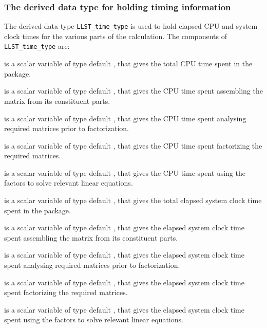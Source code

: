 \documentclass{galahad}
\newcommand{\packagename}{LLST}
\begin{document}

\subsubsection{The derived data type for holding timing 
 information}\label{typetime}
The derived data type 
{\tt \packagename\_time\_type} 
is used to hold elapsed CPU and system clock times for the various parts of 
the calculation. The components of 
{\tt \packagename\_time\_type} 
are:
\begin{description}
 is a scalar variable of type default \realdp, that gives
 the total CPU time spent in the package.

 is a scalar variable of type default \realdp, that gives
 the CPU time spent assembling the matrix  from its constituent parts.

 is a scalar variable of type default \realdp, that gives
 the CPU time spent analysing required matrices prior to factorization.

 is a scalar variable of type default \realdp, that gives
 the CPU time spent factorizing the required matrices.

 is a scalar variable of type default \realdp, that gives
 the CPU time spent using the factors to solve relevant linear equations.

 is a scalar variable of type default \realdp, that gives
 the total elapsed system clock time spent in the package.

 is a scalar variable of type default \realdp, that gives
 the elapsed system clock time spent assembling the matrix  from 
its constituent parts.

 is a scalar variable of type default \realdp, that gives
 the elapsed system clock time spent analysing required matrices prior to 
factorization.

 is a scalar variable of type default \realdp, that gives
 the elapsed system clock time spent factorizing the required matrices.

 is a scalar variable of type default \realdp, that gives
 the elapsed system clock time spent using the factors to solve relevant 
linear equations.

\end{description}

\end{document}

